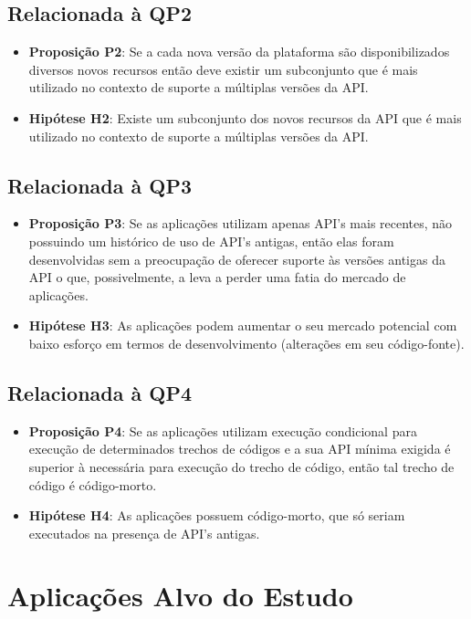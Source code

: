 \subsection{Relacionada à QP2}
	\begin{itemize}
		\item \textbf{Proposição P2}: Se a cada nova versão da plataforma são disponibilizados
		diversos novos recursos então deve existir um subconjunto que é mais utilizado no 
		contexto de suporte a múltiplas versões da API.
		\item \textbf{Hipótese H2}: Existe um subconjunto dos novos recursos da API que é
		mais utilizado no contexto de suporte a múltiplas versões da API.
	\end{itemize}

\subsection{Relacionada à QP3}
	\begin{itemize}
		\item \textbf{Proposição P3}: Se as aplicações utilizam apenas API's mais recentes,
		não possuindo um histórico de uso de API's antigas, então elas foram desenvolvidas
		sem a preocupação de oferecer suporte às versões antigas da API o que, possivelmente,
		a leva a perder uma fatia do mercado de aplicações.
		\item \textbf{Hipótese H3}: As aplicações podem aumentar o seu mercado potencial com
		baixo esforço em termos de desenvolvimento (alterações em seu código-fonte).
	\end{itemize}

\subsection{Relacionada à QP4}
	\begin{itemize}
		\item \textbf{Proposição P4}: Se as aplicações utilizam execução condicional para
		execução de determinados trechos de códigos e a sua API mínima exigida é superior
		à necessária para execução do trecho de código, então tal trecho de código é código-morto.   
		\item \textbf{Hipótese H4}: As aplicações possuem código-morto, que só seriam executados
		na presença de API's antigas.
	\end{itemize}

\section{Aplicações Alvo do Estudo} \label{sec:aplicacoes-alvo}

